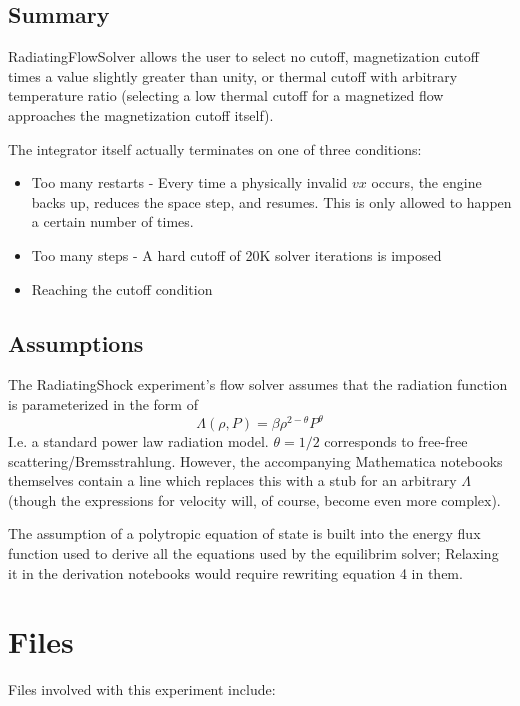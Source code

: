 \documentclass[letterpaper,12pt,twocolumn]{article}
\begin{document}
\subsection{Summary}

RadiatingFlowSolver allows the user to select no cutoff, magnetization cutoff times
a value slightly greater than unity, or thermal cutoff with arbitrary temperature
ratio (selecting a low thermal cutoff for a magnetized flow approaches the 
magnetization cutoff itself).

The integrator itself actually terminates on one of three conditions:
\begin{itemize}
\item Too many restarts - Every time a physically invalid $vx$ occurs, the 
engine backs up, reduces the space step, and resumes. This is only
allowed to happen a certain number of times.
\item Too many steps - A hard cutoff of 20K solver iterations is imposed
\item Reaching the cutoff condition
\end{itemize}

\subsection{Assumptions}

The RadiatingShock experiment's flow solver assumes that the radiation function
is parameterized in the form of
\begin{equation}
\Lambda(\rho, P) = \beta \rho^{2-\theta} P^{\theta}
\end{equation}
I.e. a standard power law radiation model. $\theta = 1/2$ corresponds to free-free
scattering/Bremsstrahlung. However, the accompanying Mathematica notebooks themselves
contain a line which replaces this with a stub for an arbitrary $\Lambda$ (though
the expressions for velocity will, of course, become even more complex).

The assumption of a polytropic equation of state is built into the energy flux
function used to derive all the equations used by the equilibrim solver; Relaxing it
in the derivation notebooks would require rewriting equation 4 in them.

\newpage
\section{Files}

Files involved with this experiment include:
\end{document}
